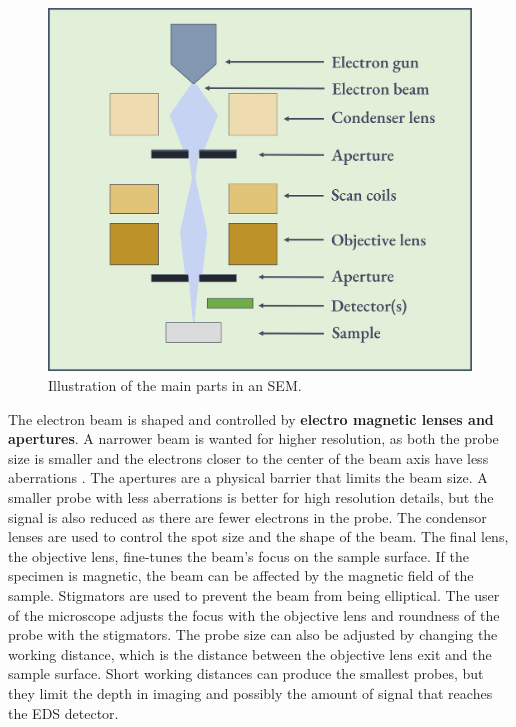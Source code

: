 \begin{figure}[ht]
    \centering
    \includegraphics[width=0.8\linewidth]{figures/SEM_setup.png}
    \caption{
        Illustration of the main parts in an SEM.
    }
    \label{fig:SEM_setup}
\end{figure}


The electron beam is shaped and controlled by \textbf{electro magnetic lenses and apertures}.
A narrower beam is wanted for higher resolution, as both the probe size is smaller and the electrons closer to the center of the beam axis have less aberrations \cite{goodhew_2001}.
The apertures are a physical barrier that limits the beam size.
A smaller probe with less aberrations is better for high resolution details, but the signal is also reduced as there are fewer electrons in the probe.
The condensor lenses are used to control the spot size and the shape of the beam.
The final lens, the objective lens, fine-tunes the beam's focus on the sample surface.
If the specimen is magnetic, the beam can be affected by the magnetic field of the sample.
Stigmators are used to prevent the beam from being elliptical.
The user of the microscope adjusts the focus with the objective lens and roundness of the probe with the stigmators.
The probe size can also be adjusted by changing the working distance, which is the distance between the objective lens exit and the sample surface.
Short working distances can produce the smallest probes, but they limit the depth in imaging and possibly the amount of signal that reaches the EDS detector.


